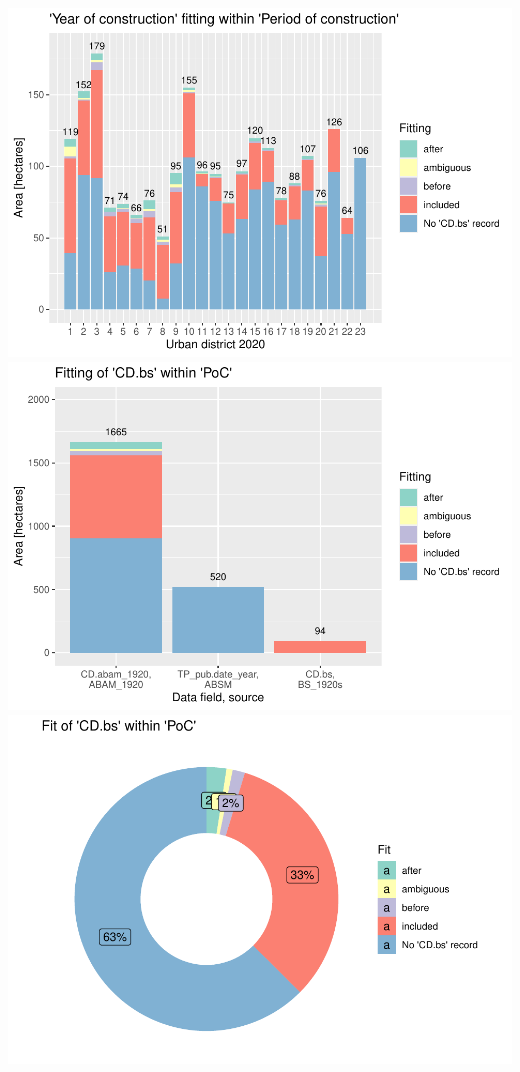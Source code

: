 \documentclass[
]{article}
\begin{document}
\includegraphics{Usage_code_files/figure-latex/unnamed-chunk-15-1.pdf}
\includegraphics{Usage_code_files/figure-latex/unnamed-chunk-15-2.pdf}
\includegraphics{Usage_code_files/figure-latex/unnamed-chunk-15-3.pdf}
\end{document}
